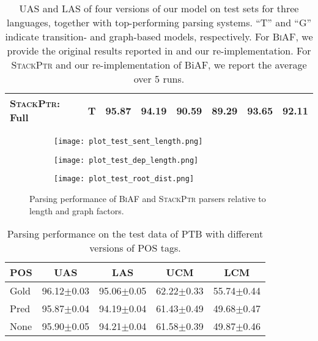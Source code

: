 \documentclass[11pt,a4paper]{article}
\begin{document}
\begin{table*}[t]
{\begin{tabular}[t]{l|c|ll|ll|ll}
\textsc{StackPtr}: \textsf{Full}  & T & \textbf{95.87} & 94.19 & \textbf{90.59} & \textbf{89.29} & 93.65 & 92.11 \\
\hline
\end{tabular}}
\caption{UAS and LAS of four versions of our model on test sets for three languages, together with top-performing parsing systems. 
``T'' and ``G'' indicate transition- and graph-based models, respectively. 
For \textsc{BiAF}, we provide the original results reported in \citet{dozat2017:ICLR} and our re-implementation.
For \textsc{StackPtr} and our re-implementation of BiAF, we report the average over 5 runs.}
\label{tab:main:comparison}
\end{table*}

\begin{figure*}[t]
\centering
\begin{subfigure}{0.19\linewidth}
\texttt{[image: plot\_test\_sent\_length.png]}
\caption{\label{fig:sent_length}}
\end{subfigure}\hfill
\begin{subfigure}{0.39\linewidth}
\texttt{[image: plot\_test\_dep\_length.png]}
\caption{\label{fig:dep_length}}
\end{subfigure}
\hfill
\begin{subfigure}{0.39\linewidth}
\texttt{[image: plot\_test\_root\_dist.png]}
\caption{\label{fig:root_dist}}
\end{subfigure}
\caption{Parsing performance of \textsc{BiAF} and \textsc{StackPtr} parsers relative to length and graph factors.}\label{fig:error_analysis}
\end{figure*}

\begin{table}[!t]
\centering
\setlength{\tabcolsep}{2pt}
{\small
\begin{tabular}[t]{l|c:c:c:c}
\hline
\textbf{POS} & UAS & LAS & UCM & LCM \\
\hline
\textsf{Gold} & 96.12$\pm$0.03 & 95.06$\pm$0.05 & 62.22$\pm$0.33 & 55.74$\pm$0.44 \\
\textsf{Pred} & 95.87$\pm$0.04 & 94.19$\pm$0.04 & 61.43$\pm$0.49 & 49.68$\pm$0.47 \\
\textsf{None} & 95.90$\pm$0.05 & 94.21$\pm$0.04 & 61.58$\pm$0.39 & 49.87$\pm$0.46 \\
\hline
\end{tabular}
}
\caption{Parsing performance on the test data of PTB with different versions of POS tags.}\label{tab:pos}
\end{table}
\end{document}

